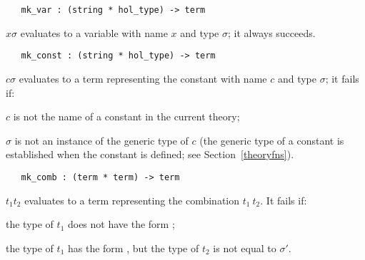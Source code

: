 \begin{boxed}
\begin{verbatim}
   mk_var : (string * hol_type) -> term
\end{verbatim}\end{boxed}

\noindent{}$x$\ml{,}$\sigma$\ml{)} evaluates to a variable
with name $x$ and type $\sigma$; it always succeeds.

\begin{boxed}
\begin{verbatim}
   mk_const : (string * hol_type) -> term
\end{verbatim}\end{boxed}


\noindent{}$c$\ml{,}$\sigma$\ml{)} evaluates to a
term representing
the constant with name $c$ and type $\sigma$; it fails if:
\begin{myenumerate}
\item $c$ is not the name of a constant in the current theory;
\item $\sigma$ is not an instance of the generic type of $c$
(the generic type of a constant is established when the constant is defined;
see Section~\ref{theoryfns}).
\end{myenumerate}

\begin{boxed}
\begin{verbatim}
   mk_comb : (term * term) -> term
\end{verbatim}\end{boxed}

\noindent{}$t_1$\ml{,}$t_2$\ml{)} evaluates to a term
representing the combination
$t_1\ t_2$. It fails if:
\begin{myenumerate}
\item the type of $t_1$ does not have the form ;
\item the type of $t_1$ has the form , but the
type of $t_2$ is not equal to $\sigma'$.
\end{myenumerate}

